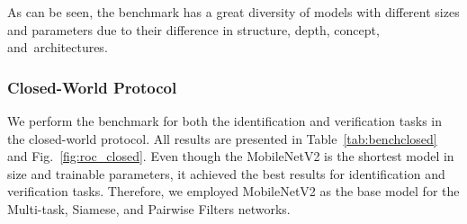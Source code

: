 As can be seen, the benchmark has a great diversity of models with different sizes and parameters due to their difference in structure, depth, concept, and~architectures. 

\subsubsection{Closed-World Protocol}
\label{sec:closed}
We perform the benchmark for both the identification and verification tasks in the closed-world protocol.
All results are presented in Table~\ref{tab:benchclosed} and Fig.~\ref{fig:roc_closed}.
Even though the MobileNetV2 is the shortest model in size and trainable parameters, it achieved the best results for identification and verification tasks.
Therefore, we employed MobileNetV2 as the base model for the Multi-task, Siamese, and Pairwise Filters networks.

